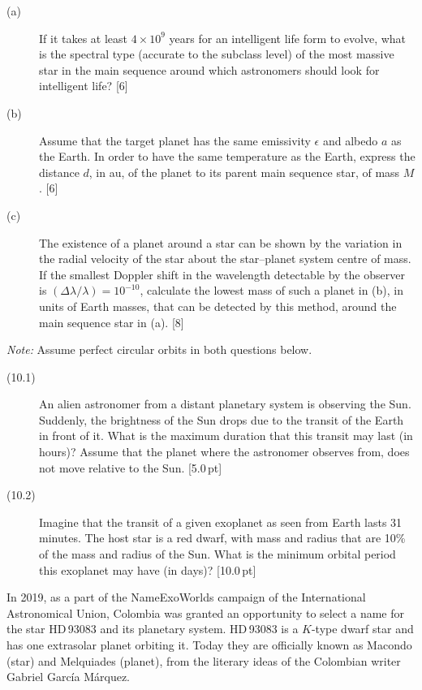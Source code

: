 \begin{description}
\item[(a)] If it takes at least $4\times10^{9}$ years for an intelligent life
  form to evolve, what is the spectral type (accurate to the subclass level) of
  the most massive star in the main sequence around which astronomers should
  look for intelligent life? \hfill[6]
\item[(b)] Assume that the target planet has the same emissivity $\epsilon$ and
  albedo $a$ as the Earth. In order to have the same temperature as the Earth,
  express the distance $d$, in au, of the planet to its parent main sequence
  star, of mass $M$. \hfill[6]
\item[(c)] The existence of a planet around a star can be shown by the variation
  in the radial velocity of the star about the star--planet system centre of
  mass. If the smallest Doppler shift in the wavelength detectable by the
  observer is $(\Delta\lambda/\lambda) = 10^{-10}$, calculate the lowest mass
  of such a planet in (b), in units of Earth masses, that can be detected by
  this method, around the main sequence star in (a). \hfill[8]
\end{description}

\textit{Note:} Assume perfect circular orbits in both questions below.

\begin{description}
\item[(10.1)] An alien astronomer from a distant planetary system is observing
  the Sun. Suddenly, the brightness of the Sun drops due to the transit of the
  Earth in front of it. What is the maximum duration that this transit may last
  (in hours)? Assume that the planet where the astronomer observes from, does not
  move relative to the Sun. \hfill[5.0\,pt]
\item[(10.2)] Imagine that the transit of a given exoplanet as seen from Earth
  lasts 31 minutes. The host star is a red dwarf, with mass and radius that are
  10\% of the mass and radius of the Sun. What is the minimum orbital period
  this exoplanet may have (in days)? \hfill[10.0\,pt]
\end{description}

In 2019, as a part of the NameExoWorlds campaign of the International
Astronomical Union, Colombia was granted an opportunity to select a name for the
star HD\,93083 and its planetary system. HD\,93083 is a $K$-type dwarf star and
has one extrasolar planet orbiting it. Today they are officially known as
Macondo (star) and Melquiades (planet), from the literary ideas of the Colombian
writer Gabriel Garc\'ia M\'arquez.

